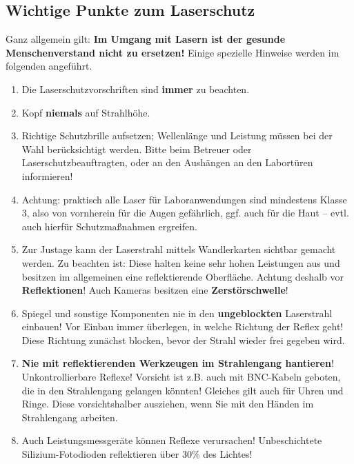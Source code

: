 \documentclass[
class=book,
accentcolor=1b,
custommargins=geometry,
fontsize=11pt,
thesis={type=Versuchsanleitung},
ruledheaders=all,
headline=false,
instbox=false,
marginpar=false,
title=small,
ignore-missing-data=true,
twoside=false,
logofile=apqdesign/tuda_logo.pdf,
pdfa=false %
]{apqpub}
\begin{document}
	\cleardoublepage
\subsection*{Wichtige Punkte zum Laserschutz}
Ganz allgemein gilt: \textbf{Im Umgang mit Lasern ist der gesunde Menschenverstand nicht zu ersetzen!} Einige
spezielle Hinweise werden im folgenden angeführt.
\begin{enumerate}
\item Die Laserschutzvorschriften sind \textbf{immer} zu beachten.
\vspace{-2pt}
\item Kopf \textbf{niemals} auf Strahlhöhe.
\vspace{-2pt}
\item Richtige Schutzbrille aufsetzen; Wellenlänge und Leistung müssen bei der Wahl berücksichtigt werden. Bitte beim Betreuer oder Laserschutzbeauftragten, oder an den Aushängen an den Labortüren informieren!
\vspace{-2pt}
\item Achtung: praktisch alle Laser für Laboranwendungen sind mindestens Klasse 3, also von vornherein für die Augen gefährlich, ggf. auch für die Haut -- evtl. auch hierfür Schutzmaßnahmen ergreifen.
\vspace{-2pt}
\item Zur Justage kann der Laserstrahl mittels Wandlerkarten sichtbar gemacht werden. Zu beachten ist: Diese halten keine sehr hohen Leistungen aus und besitzen im allgemeinen eine reflektierende Oberfläche. Achtung deshalb vor \textbf{Reflektionen}! Auch Kameras
besitzen eine \textbf{Zerstörschwelle}!
\vspace{-2pt}
\item Spiegel und sonstige Komponenten nie in den \textbf{ungeblockten} Laserstrahl einbauen! Vor Einbau immer überlegen, in welche Richtung der Reflex geht! Diese Richtung zunächst blocken, bevor der Strahl wieder frei gegeben wird.
\vspace{-2pt}
\item \textbf{Nie mit reflektierenden Werkzeugen im Strahlengang hantieren}! Unkontrollierbare Reflexe! Vorsicht ist z.B. auch mit BNC-Kabeln geboten, die in den Strahlengang gelangen könnten!
Gleiches gilt auch für Uhren und Ringe. Diese vorsichtshalber ausziehen, wenn Sie mit den Händen im Strahlengang arbeiten.
\vspace{-2pt}
\item Auch Leistungsmessgeräte können Reflexe verursachen! Unbeschichtete Silizium-Fotodioden reflektieren über 30\% des Lichtes!

\end{enumerate}
\end{document}
